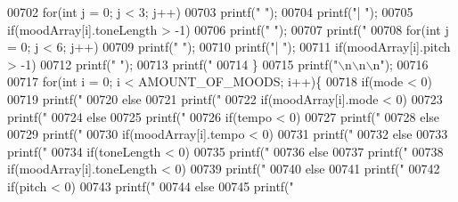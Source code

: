 \begin{DoxyCode}
{{{{{{{{{{{00702     \textcolor{keywordflow}{for}(\textcolor{keywordtype}{int} j = 0; j < 3; j++)
00703       printf(\textcolor{stringliteral}{" "});
00704     printf(\textcolor{stringliteral}{"|    "});
00705     \textcolor{keywordflow}{if}(moodArray[i].toneLength > -1)
00706       printf(\textcolor{stringliteral}{" "});
00707     printf(\textcolor{stringliteral}{" %
00708     \textcolor{keywordflow}{for}(\textcolor{keywordtype}{int} j = 0; j < 6; j++)
00709       printf(\textcolor{stringliteral}{" "});
00710     printf(\textcolor{stringliteral}{"|  "});
00711     \textcolor{keywordflow}{if}(moodArray[i].pitch > -1)
00712       printf(\textcolor{stringliteral}{" "});
00713     printf(\textcolor{stringliteral}{" %
00714   \}
00715   printf(\textcolor{stringliteral}{"\(\backslash\)n\(\backslash\)n\(\backslash\)n"});
00716 
00717   \textcolor{keywordflow}{for}(\textcolor{keywordtype}{int} i = 0; i < AMOUNT_OF_MOODS; i++)\{
00718     \textcolor{keywordflow}{if}(mode < 0)
00719       printf(\textcolor{stringliteral}{" %
00720     \textcolor{keywordflow}{else}
00721       printf(\textcolor{stringliteral}{" %
00722     \textcolor{keywordflow}{if}(moodArray[i].mode < 0)
00723       printf(\textcolor{stringliteral}{"%
00724     \textcolor{keywordflow}{else}
00725       printf(\textcolor{stringliteral}{" %
00726     \textcolor{keywordflow}{if}(tempo < 0)
00727       printf(\textcolor{stringliteral}{"%
00728     \textcolor{keywordflow}{else}
00729       printf(\textcolor{stringliteral}{" %
00730     \textcolor{keywordflow}{if}(moodArray[i].tempo < 0)
00731       printf(\textcolor{stringliteral}{"%
00732     \textcolor{keywordflow}{else}
00733       printf(\textcolor{stringliteral}{" %
00734     \textcolor{keywordflow}{if}(toneLength < 0)
00735       printf(\textcolor{stringliteral}{"%
00736     \textcolor{keywordflow}{else}
00737       printf(\textcolor{stringliteral}{" %
00738     \textcolor{keywordflow}{if}(moodArray[i].toneLength < 0)
00739       printf(\textcolor{stringliteral}{"%
00740     \textcolor{keywordflow}{else}
00741       printf(\textcolor{stringliteral}{" %
00742     \textcolor{keywordflow}{if}(pitch < 0)
00743       printf(\textcolor{stringliteral}{"%
00744     \textcolor{keywordflow}{else}
00745       printf(\textcolor{stringliteral}{" %
}}}}}}}}}}}}}}}}}}}}}}}}}}}
\end{DoxyCode}
